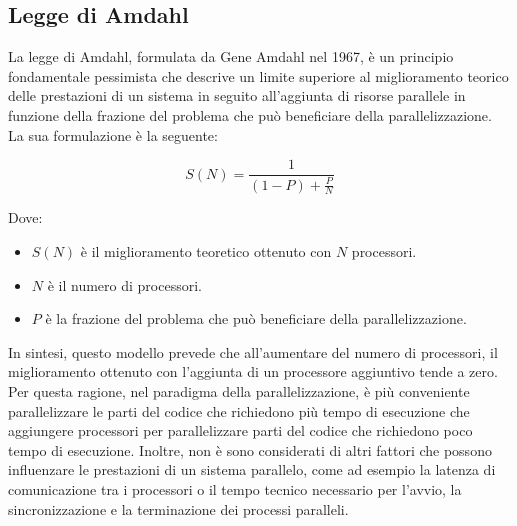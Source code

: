 \subsection{Legge di Amdahl}
\label{sec:amdahl}

La legge di Amdahl, formulata da Gene Amdahl nel 1967, è un principio
fondamentale pessimista che descrive un limite superiore al miglioramento
teorico delle prestazioni di un sistema in seguito all'aggiunta di risorse
parallele in funzione della frazione del problema che può beneficiare della
parallelizzazione. La sua formulazione è la seguente:

\begin{equation}
  S(N) = \frac{1}{(1 - P) + \frac{P}{N}}
\end{equation}

Dove:
\begin{itemize}
  \item $S(N)$ è il miglioramento teoretico ottenuto con $N$ processori.

  \item $N$ è il numero di processori.

  \item $P$ è la frazione del problema che può beneficiare della parallelizzazione.
\end{itemize}

In sintesi, questo modello prevede che all'aumentare del numero di processori,
il miglioramento ottenuto con l'aggiunta di un processore aggiuntivo tende a
zero. Per questa ragione, nel paradigma della parallelizzazione, è più conveniente
parallelizzare le parti del codice che richiedono più tempo di esecuzione che aggiungere
processori per parallelizzare parti del codice che richiedono poco tempo di esecuzione.
Inoltre, non è sono considerati di altri fattori che possono influenzare le prestazioni
di un sistema parallelo, come ad esempio la latenza di comunicazione tra i
processori o il tempo tecnico necessario per l'avvio, la sincronizzazione e la terminazione
dei processi paralleli.
